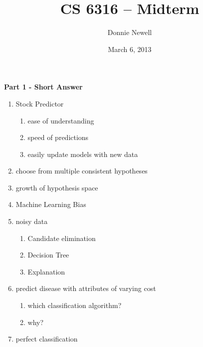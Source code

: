 \setlength{\topmargin}{-.5in}
\setlength{\textheight}{9in}
\setlength{\oddsidemargin}{.125in}
\setlength{\textwidth}{6.25in}

\title{CS 6316 -- Midterm}
\author{Donnie Newell}
\date{March 6, 2013}
\maketitle

{\bf Part 1 - Short Answer}
\begin{enumerate}
	\item
	Stock Predictor
	\begin{enumerate}
		\item
		ease of understanding

		\item
		speed of predictions

		\item
		easily update models with new data

	\end{enumerate}
	\item
	choose from multiple consistent hypotheses

	\item
	growth of hypothesis space

	\item
	Machine Learning Bias

	\item
	noisy data
	\begin{enumerate}
		\item
		Candidate elimination
		
		\item
		Decision Tree
		
		\item
		Explanation
		
	\end{enumerate}
	
	\item
	predict disease with attributes of varying cost
	\begin{enumerate}
		\item
		which classification algorithm?
		
		\item
		why?
		
	\end{enumerate}
	
	\item
	perfect classification
	

\end{enumerate}
